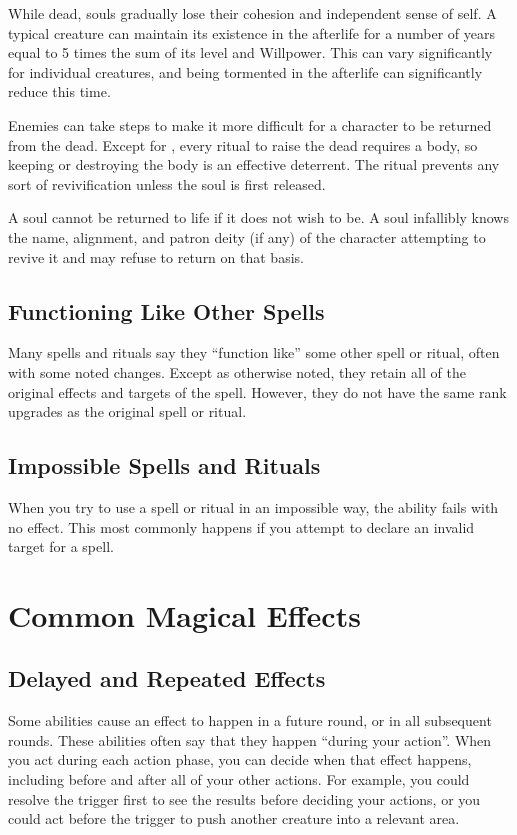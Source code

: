      While dead, souls gradually lose their cohesion and independent sense of self.
    A typical creature can maintain its existence in the afterlife for a number of years equal to 5 times the sum of its level and Willpower.
    This can vary significantly for individual creatures, and being tormented in the afterlife can significantly reduce this time.

     Enemies can take steps to make it more difficult for a character to be returned from the dead.
    Except for , every ritual to raise the dead requires a body, so keeping or destroying the body is an effective deterrent.
    The  ritual prevents any sort of revivification unless the soul is first released.

     A soul cannot be returned to life if it does not wish to be.
    A soul infallibly knows the name, alignment, and patron deity (if any) of the character attempting to revive it and may refuse to return on that basis.

  \subsection{Functioning Like Other Spells}\label{Functioning Like Other Spells}
    Many spells and rituals say they ``function like'' some other spell or ritual, often with some noted changes.
    Except as otherwise noted, they retain all of the original effects and targets of the spell.
    However, they do not have the same rank upgrades as the original spell or ritual.

  \subsection{Impossible Spells and Rituals}
    When you try to use a spell or ritual in an impossible way, the ability fails with no effect.
    This most commonly happens if you attempt to declare an invalid target for a spell.

\section{Common Magical Effects}
  \subsection{Delayed and Repeated Effects}\label{Delayed and Repeated Effects}
    Some abilities cause an effect to happen in a future round, or in all subsequent rounds.
    These abilities often say that they happen ``during your action''.
    When you act during each action phase, you can decide when that effect happens, including before and after all of your other actions.
    For example, you could resolve the trigger first to see the results before deciding your actions, or you could act before the trigger to push another creature into a relevant area.


